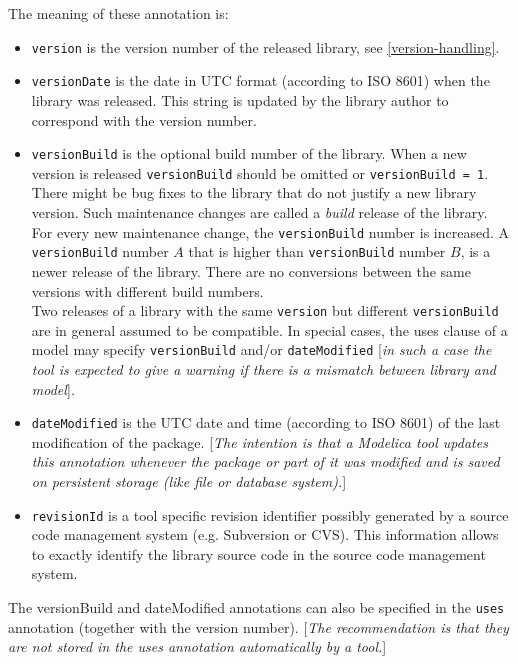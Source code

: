 The meaning of these annotation is:
\begin{itemize}
\item
  \lstinline!version! is the version number of the released library,
  see \autoref{version-handling}.
\item
  \lstinline!versionDate! is the date in UTC format (according to ISO
  8601) when the library was released. This string is updated by the
  library author to correspond with the version number.
\item
  \lstinline!versionBuild! is the optional build number of the library.
  When a new version is released \lstinline!versionBuild! should be omitted or
  \lstinline!versionBuild = 1!. There might be bug fixes to the library that do
  not justify a new library version. Such maintenance changes are called
  a \emph{build} release of the library. For every new maintenance change,
  the \lstinline!versionBuild! number is increased. A \lstinline!versionBuild! number $A$
  that is higher than \lstinline!versionBuild! number $B$, is a newer release of the
  library. There are no conversions between the same versions with
  different build numbers. \emph{\\}Two releases of a library with the same \lstinline!version! but different
  \lstinline!versionBuild! are in general assumed to be compatible. In special
  cases, the uses clause of a model may specify \lstinline!versionBuild! and/or
  \lstinline!dateModified! {[}\emph{in such a case the tool is expected to give
  a warning if there is a mismatch between library and model}{]}\emph{.}
\item
  \lstinline!dateModified! is the UTC date and time (according to ISO
  8601) of the last modification of the package. {[}\emph{The intention
  is that a Modelica tool updates this annotation whenever the package
  or part of it was modified and is saved on persistent storage (like
  file or database system).}{]}
\item
  \lstinline!revisionId! is a tool specific revision identifier
  possibly generated by a source code management system (e.g. Subversion
  or CVS). This information allows to exactly identify the library
  source code in the source code management system.
\end{itemize}

The versionBuild and dateModified annotations can also be specified in
the \lstinline!uses! annotation (together with the version number). {[}\emph{The
recommendation is that they are not stored in the uses annotation
automatically by a tool.}{]}

